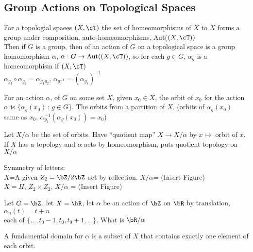 
\subsection{Group Actions on Topological Spaces}

For a topologial spaees $(X, \cT)$ the set of homeomorphisms of $X$ to $X$ forms a group under composition, auto-homeomorphisms, Aut($(X, \cT))$ \\
Then if $G$ is a group, then of an action of $G$ on a topological space is a group homomorphism $\alpha$, $\alpha: G \to \text{Aut}((X, \cT))$, so for each $g \in G$, $\alpha_g$ is a homeomorphism if $(X, \cT)$ \\
$\alpha_{g_1} \circ \alpha_{g_2} = \alpha_{g_1g_2}$, $\alpha_{g_1^{-1}} = (\alpha_{g_1})^{-1}$ 

\begin{definition}
    For an action $\alpha$, of $G$ on some set $X$, given $x_0 \in X$, the orbit of $x_0$ for the action $\alpha$ is $\{ \alpha_g(x_0) \, : \, g \in G \}$. The orbits from a partition of $X$. (orbits of $\alpha_g(x_0)$ same as $x_0$, $\alpha_{g_1}^{-1} (\alpha_g (x_0)) = x_0$) 
\end{definition}

\noindent
Let $X/\alpha$ be the set of orbits. Have ``quotient map'' $X \to X/\alpha$ by $x \mapsto $ orbit of $x$. \\
If $X$ has a topology and $\alpha$ acts by homeomorphism, puts quotient topology on $X/\alpha$ 

\begin{example}
    Symmetry of letters: \\
    $X$=A given $Z_2 = \bZ/2\bZ$ act by reflection. $X/\alpha$= (Insert Figure) \\
    $X=H$, $Z_2 \times Z_2$, $X/\alpha$ = (Insert Figure)
\end{example}

\begin{example}
    Let $G=\bZ$, let $X = \bR$, let $\alpha$ be an action of $\bZ$ on $\bR$ by translation, $\alpha_n(t)=t+n$ \\
    each of $\{ \ldots, t_0-1, t_0, t_0+1, \ldots \}$. What is $\bR/\alpha$ 
\end{example}

\begin{example}
    A fundamental domain for $\alpha$ is a subset of $X$ that contains exactly one element of each orbit. 
\end{example}

